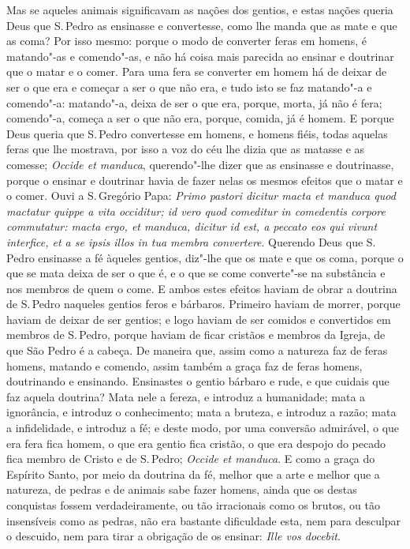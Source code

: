 Mas se aqueles animais significavam as nações dos gentios, e estas
nações queria Deus que S.\,Pedro as ensinasse e convertesse, como lhe
manda que as mate e que as coma? Por isso mesmo: porque o modo de
converter feras em homens, é matando"-as e comendo"-as, e não há coisa
mais parecida ao ensinar e
doutrinar que o matar e o comer. Para uma fera se converter em homem há
de deixar de ser o que era e começar a ser o que não era, e tudo isto se
faz matando"-a e comendo"-a: matando"-a, deixa de ser o que era, porque,
morta, já não é fera; comendo"-a, começa a ser o que não era, porque,
comida, já é homem. E porque Deus queria que S.\,Pedro convertesse em
homens, e homens fiéis, todas aquelas feras que lhe mostrava, por isso a
voz do céu lhe dizia que as matasse e as comesse; \emph{Occide et
manduca}, querendo"-lhe dizer que as ensinasse e doutrinasse, porque o
ensinar e doutrinar havia de fazer nelas os mesmos efeitos que o matar e
o comer. Ouvi a S.\,Gregório Papa: \emph{Primo pastori dicitur macta et
manduca quod mactatur quippe a vita occiditur; id vero quod comeditur in
comedentis corpore commutatur: macta ergo, et manduca, dicitur id est, a
peccato eos qui vivunt interfice, et a se ipsis illos in tua membra
convertere}.
Querendo Deus que S.\,Pedro ensinasse a fé àqueles gentios, diz"-lhe que
os mate e que os coma, porque o que se mata deixa de ser o que é, e o
que se come converte"-se na substância e nos membros de quem o come. E
ambos estes efeitos haviam de obrar a doutrina de S.\,Pedro naqueles
gentios feros e bárbaros. Primeiro haviam de morrer, porque haviam de
deixar de ser gentios; e logo haviam de ser comidos e convertidos em
membros de S.\,Pedro, porque haviam de ficar cristãos e membros da
Igreja, de que São Pedro é a cabeça. De maneira que, assim como a
natureza faz de feras homens, matando e comendo, assim também a graça
faz de feras homens, doutrinando e ensinando. Ensinastes o gentio
bárbaro e rude, e que cuidais que faz aquela doutrina? Mata nele a
fereza, e introduz a humanidade; mata a ignorância, e introduz o
conhecimento; mata a bruteza, e introduz a razão; mata a infidelidade, e
introduz a fé; e deste modo, por uma conversão admirável, o que era fera
fica homem, o que era gentio fica cristão, o que era despojo do pecado
fica membro de Cristo e de S.\,Pedro; \emph{Occide et manduca}. E como a
graça do Espírito Santo, por meio da doutrina da fé, melhor que a arte e
melhor que a natureza, de pedras e de animais sabe fazer homens, ainda
que os destas conquistas fossem verdadeiramente, ou tão irracionais como
os brutos, ou tão insensíveis como as pedras, não era bastante
dificuldade esta, nem para desculpar o descuido, nem para tirar a
obrigação de os ensinar: \emph{Ille vos docebit}.

